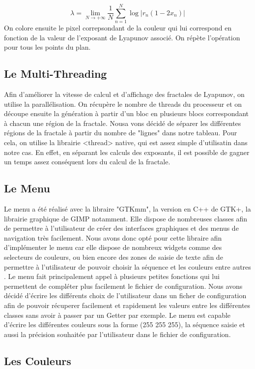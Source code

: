 \documentclass{article}
\begin{document}
$$
\lambda = \lim_{N \to +\infty} \frac{1}{N} \sum_{n=1}^{N} \log | r_n(1-2x_n) |
$$
On colore ensuite le pixel correpsondant de la couleur qui lui correspond en fonction de la valeur de l'exposant de Lyapunov associé.
On répète l'opération pour tous les points du plan.

\subsection*{Le Multi-Threading}
Afin d'améliorer la vitesse de calcul et d'affichage des fractales de Lyapunov, on utilise la parallélisation. On récupère le nombre de threads du processeur et on découpe ensuite la génération à partir d'un bloc en plusieurs blocs correspondant à chacun une région de la fractale.
Nousa vons décidé de séparer les différentes régions de la fractale à partir du nombre de "lignes" dans notre tableau.
 Pour cela, on utilise la librairie <thread> native, qui est assez simple d'utilisatin dans notre cas.
En effet, en séparant les calculs des exposants, il est possible de gagner un temps assez conséquent lors du calcul de la fractale.

\subsection*{Le Menu}
Le menu a été réalisé avec la libraire "GTKmm", la version en C++ de GTK+, la librairie graphique de GIMP notamment. Elle dispose de nombreuses classes afin de permettre à l'utilisateur de créer des interfaces graphiques et des menus de navigation très facilement. Nous avons donc opté pour cette libraire afin d'implémenter le menu car elle dispose de nombreux widgets comme des selecteurs de couleurs, ou bien encore des zones de saisie de texte afin de permettre à l'utilisateur de pouvoir choisir la séquence et les couleurs entre autres . Le menu fait principalement appel à plusieurs petites fonctions qui lui permettent de compléter plus facilement le fichier de configuration. Nous avons décidé d'écrire les différents choix de l'utilisateur dans un ficher de configuration afin de pouvoir récuperer facilement et rapidement les valeurs entre les différentes classes sans avoir à passer par un Getter par exemple. Le menu est capable d'écrire les différentes couleurs sous la forme (255 255 255), la séquence saisie et aussi la précision souhaitée par l'utilisateur dans le fichier de configuration.

\subsection*{Les Couleurs}
\end{document}
